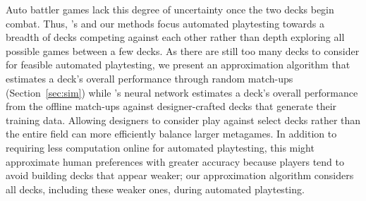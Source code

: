 Auto battler games lack this degree of uncertainty once the two decks begin combat.
Thus, \citeauthor{tencent_autobattle_lineup}'s 
and our methods focus automated playtesting towards a breadth of decks competing
against each other rather than depth exploring all possible games between a few
decks.  As there are still too many decks to consider for feasible automated
playtesting, we present an approximation algorithm that estimates a deck's overall
performance through random match-ups (Section~\ref{sec:sim}) while
\citeauthor{tencent_autobattle_lineup}'s neural network estimates a deck's overall
performance from the offline match-ups against designer-crafted decks that generate
their training data.  Allowing designers to consider play against select decks
rather than the entire field can more efficiently balance larger metagames.
In addition to requiring less computation online for automated playtesting, this
might approximate human preferences with greater accuracy because players
tend to avoid building decks that appear weaker; our approximation algorithm
considers all decks, including these weaker ones, during automated playtesting.
